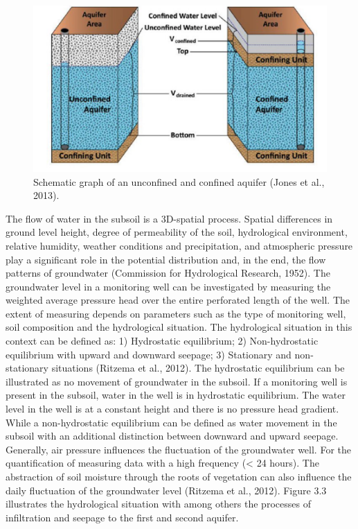 \begin{figure}[h]
    \centering
    \includegraphics[width=0.95\linewidth]{figures/figures theory/Jones et al.png}
    \caption{Schematic graph of an unconfined and confined aquifer (Jones et al., 2013).}
\end{figure}

The flow of water in the subsoil is a 3D-spatial process. Spatial differences in ground level height, degree of permeability of the soil, hydrological environment, relative humidity, weather conditions and precipitation, and atmospheric pressure play a significant role in the potential distribution and, in the end, the flow patterns of groundwater (Commission for Hydrological Research, 1952). The groundwater level in a monitoring well can be investigated by measuring the weighted average pressure head over the entire perforated length of the well. 
The extent of measuring depends on parameters such as the type of monitoring well, soil composition and the hydrological situation. The hydrological situation in this context can be defined as: 1) Hydrostatic equilibrium; 2) Non-hydrostatic equilibrium with upward and downward seepage; 3) Stationary and non-stationary situations (Ritzema et al., 2012). The hydrostatic equilibrium can be illustrated as no movement of groundwater in the subsoil. If a monitoring well is present in the subsoil, water in the well is in hydrostatic equilibrium. The water level in the well is at a constant height and there is no pressure head gradient. While a non-hydrostatic equilibrium can be defined as water movement in the subsoil with an additional distinction between downward and upward seepage. Generally, air pressure influences the fluctuation of the groundwater well. For the quantification of measuring data with a high frequency (< 24 hours). The abstraction of soil moisture through the roots of vegetation can also influence the daily fluctuation of the groundwater level (Ritzema et al., 2012). Figure 3.3 illustrates the hydrological situation with among others the processes of infiltration and seepage to the first and second aquifer. 

